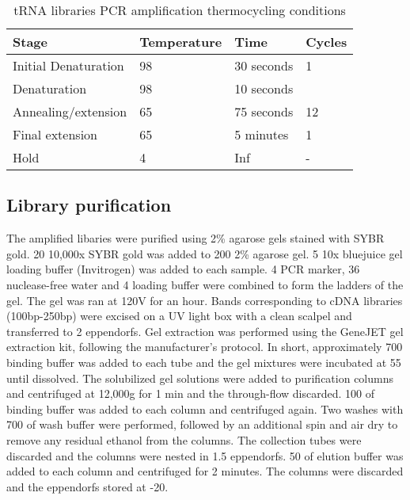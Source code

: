 \begin{table}[]
\centering
\begin{tabular}{|l|l|l|l|}
\hline
\rowcolor[HTML]{9B9B9B}
\textbf{Stage}       & \textbf{Temperature} & \textbf{Time} & \textbf{Cycles}      \\ \hline
Initial Denaturation & 98\C{}                  & 30 seconds    & 1                    \\ \hline
Denaturation         & 98\C{}                    & 10 seconds    &                      \\ \cline{1-3}
Annealing/extension  & 65\C{}                    & 75 seconds    & \multirow{-2}{*}{12} \\ \hline
Final extension      & 65\C{}                    & 5 minutes     & 1                    \\ \hline
Hold                 & 4\C{}                     & Inf           & -                    \\ \hline
\end{tabular}
\caption[tRNA libraries PCR amplification thermocycling conditions]{tRNA libraries PCR amplification thermocycling conditions}
\label{tab:my-pcr_tRNA}
\end{table}

\subsection{Library purification}
The amplified libaries were purified using 2\% agarose gels stained with SYBR gold.
20\ul{} 10,000x SYBR gold was added to 200\ml{} 2\% agarose gel.
5\ul{} 10x bluejuice gel loading buffer (Invitrogen) was added to each sample.
4\ul{} PCR marker, 36\ul{} nuclease-free water and 4\ul{} loading buffer were combined to form the ladders of the gel.
The gel was ran at 120V for an hour.
Bands corresponding to cDNA libraries (100bp-250bp) were excised on a UV light box with a clean scalpel and transferred to 2\ml{} eppendorfs.
Gel extraction was performed using the GeneJET gel extraction kit, following the manufacturer's protocol.
In short, approximately 700\ul{} binding buffer was added to each tube and the gel mixtures were incubated at 55\C{} until dissolved.
The solubilized gel solutions were added to purification columns and centrifuged at 12,000g for 1 min and the through-flow discarded.
100\ul{} of binding buffer was added to each column and centrifuged again.
Two washes with 700\ul{} of wash buffer were performed, followed by an additional spin and air dry to remove any residual ethanol from the columns.
The collection tubes were discarded and the columns were nested in 1.5\ml{} eppendorfs.
50\ul{} of elution buffer was added to each column and centrifuged for 2 minutes.
The columns were discarded and the eppendorfs stored at -20\C{}.

